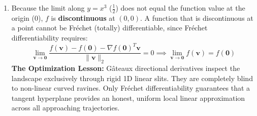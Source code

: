\begin{enumerate}[label=(\alph*)]
    \item Because the limit along $y = x^3$ ($\frac{1}{2}$) does not equal the function value at the origin ($0$), $f$ is \textbf{discontinuous} at $(0, 0)$.
    A function that is discontinuous at a point cannot be Fréchet (totally) differentiable, since Fréchet differentiability requires:
    \begin{equation*}
    \lim_{\mathbf{v} \to \mathbf{0}} \frac{f(\mathbf{v}) - f(\mathbf{0}) - \nabla f(\mathbf{0})^T \mathbf{v}}{\|\mathbf{v}\|_2} = 0 \implies \lim_{\mathbf{v} \to \mathbf{0}} f(\mathbf{v}) = f(\mathbf{0})
    \end{equation*}
    \textbf{The Optimization Lesson:} Gâteaux directional derivatives inspect the landscape exclusively through rigid 1D linear slits. They are completely blind to non-linear curved ravines. Only Fréchet differentiability guarantees that a tangent hyperplane provides an honest, uniform local linear approximation across all approaching trajectories.
\end{enumerate}

